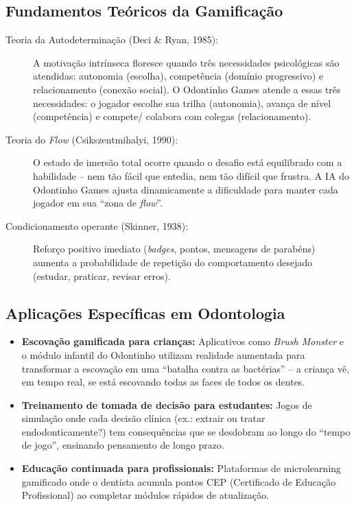 
\subsection{Fundamentos Teóricos da Gamificação}

\begin{description}
  \item[Teoria da Autodeterminação (Deci \& Ryan, 1985):] A motivação intrínseca
    floresce quando três necessidades psicológicas são atendidas: autonomia
    (escolha), competência (domínio progressivo) e relacionamento (conexão
    social). O Odontinho Games atende a essas três necessidades: o jogador
    escolhe sua trilha (autonomia), avança de nível (competência) e compete/
    colabora com colegas (relacionamento).

  \item[Teoria do \textit{Flow} (Csikszentmihalyi, 1990):] O estado de
    imersão total ocorre quando o desafio está equilibrado com a habilidade --
    nem tão fácil que entedia, nem tão difícil que frustra. A IA do Odontinho
    Games ajusta dinamicamente a dificuldade para manter cada jogador em sua
    ``zona de \textit{flow}''.

  \item[Condicionamento operante (Skinner, 1938):] Reforço positivo imediato
    (\textit{badges}, pontos, mensagens de parabéns) aumenta a probabilidade de
    repetição do comportamento desejado (estudar, praticar, revisar erros).
\end{description}

\subsection{Aplicações Específicas em Odontologia}

\begin{itemize}
  \item \textbf{Escovação gamificada para crianças:} Aplicativos como
    \textit{Brush Monster} e o módulo infantil do Odontinho utilizam realidade
    aumentada para transformar a escovação em uma ``batalha contra as bactérias''
    -- a criança vê, em tempo real, se está escovando todas as faces de todos
    os dentes.

  \item \textbf{Treinamento de tomada de decisão para estudantes:} Jogos de
    simulação onde cada decisão clínica (ex.: extrair ou tratar
    endodonticamente?) tem consequências que se desdobram ao longo do ``tempo
    de jogo'', ensinando pensamento de longo prazo.

  \item \textbf{Educação continuada para profissionais:} Plataformas de
    microlearning gamificado onde o dentista acumula pontos CEP (Certificado
    de Educação Profissional) ao completar módulos rápidos de atualização.
\end{itemize}

